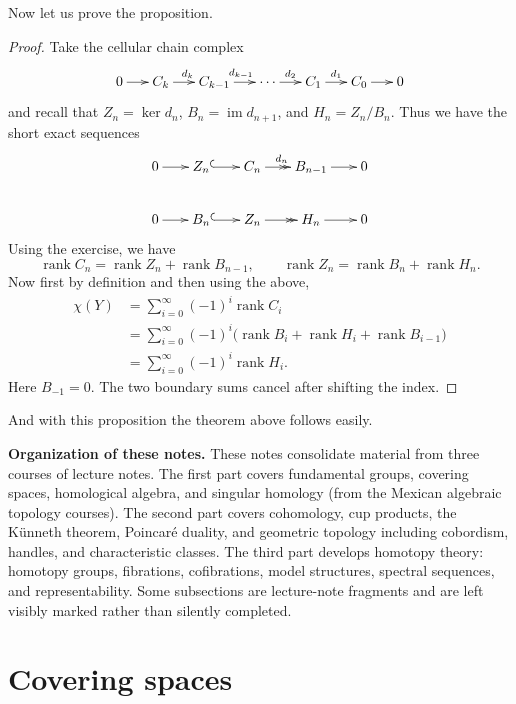 Now let us prove the proposition.

\begin{proof}
Take the cellular chain complex
$$
\xymatrix@C=1.5em{
0 \ar[r]
 & C_k \ar[r]^{d_k}
 & C_{k-1} \ar[r]^{d_{k-1}}
 & \cdots \ar[r]^{d_2}
 & C_1 \ar[r]^{d_1}
 & C_0 \ar[r]
 & 0
}
$$
and recall that $Z_n=\ker d_n$,
$B_n=\operatorname{im}d_{n+1}$,
and $H_n=Z_n/B_n$. Thus we have the short
exact sequences
$$
\xymatrix@C=1.8em@R=2.3em{
0 \ar[r]
 & Z_n \ar@{^{(}->}[r]
 & C_n \ar@{->>}[r]^{d_n}
 & B_{n-1} \ar[r]
 & 0 \\
0 \ar[r]
 & B_n \ar@{^{(}->}[r]
 & Z_n \ar@{->>}[r]
 & H_n \ar[r]
 & 0
}
$$
Using the exercise, we have
$$
\operatorname{rank}C_n=
\operatorname{rank}Z_n+
\operatorname{rank}B_{n-1},
\qquad
\operatorname{rank}Z_n=
\operatorname{rank}B_n+
\operatorname{rank}H_n.
$$
Now first by definition and then using the
above,
$$
\begin{aligned}
\chi(Y)
&=\sum_{i=0}^{\infty}(-1)^i
\operatorname{rank}C_i\\
&=\sum_{i=0}^{\infty}(-1)^i
\big(\operatorname{rank}B_i
+\operatorname{rank}H_i
+\operatorname{rank}B_{i-1}\big)\\
&=\sum_{i=0}^{\infty}(-1)^i
\operatorname{rank}H_i.
\end{aligned}
$$
Here $B_{-1}=0$. The two boundary sums cancel
after shifting the index.
\end{proof}

And with this proposition the theorem above
follows easily.





\medskip
\noindent
{\bf Organization of these notes.}
These notes consolidate material from three courses
of lecture notes.
The first part covers fundamental groups, covering
spaces, homological algebra, and singular homology
(from the Mexican algebraic topology courses).
The second part covers cohomology, cup products,
the K\"unneth theorem, Poincar\'e duality, and
geometric topology including cobordism, handles,
and characteristic classes.
The third part develops homotopy theory: homotopy
groups, fibrations, cofibrations, model structures,
spectral sequences, and representability.
Some subsections are lecture-note fragments and
are left visibly marked rather than silently
completed.


\section{Covering spaces}
\label{section-covering-spaces}


